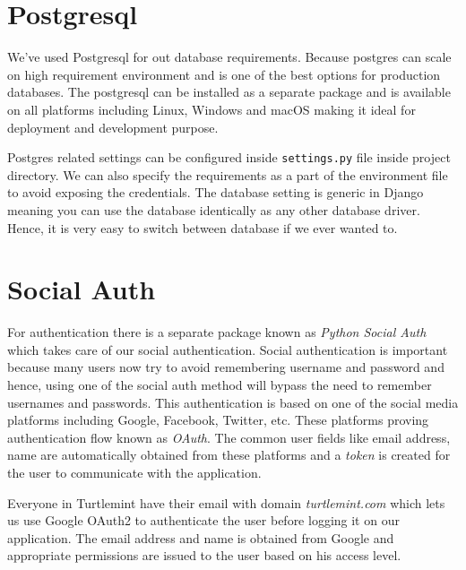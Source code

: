 \section{Postgresql}
We've used Postgresql for out database requirements. Because postgres can
scale on high requirement environment and is one of the best options for
production databases. The postgresql can be installed as a separate package
and is available on all platforms including Linux, Windows and macOS making
it ideal for deployment and development purpose.

Postgres related settings can be configured inside \texttt{settings.py} file
inside project directory. We can also specify the requirements as a part of the
environment file to avoid exposing the credentials. The database setting is
generic in Django meaning you can use the database identically as any other
database driver. Hence, it is very easy to switch between database if we ever
wanted to.

\section{Social Auth}
For authentication there is a separate package known as
\textit{Python Social Auth} which takes care of our social authentication.
Social authentication is important because many users now try to avoid
remembering username and password and hence, using one of the social auth
method will bypass the need to remember usernames and passwords. This
authentication is based on one of the social media platforms including Google,
Facebook, Twitter, etc. These platforms proving authentication flow known as
\textit{OAuth}. The common user fields like email address, name are
automatically obtained from these platforms and a \textit{token} is created
for the user to communicate with the application.

Everyone in Turtlemint have their email with domain \textit{turtlemint.com}
which lets us use Google OAuth2 to authenticate the user before logging it
on our application. The email address and name is obtained from Google and
appropriate permissions are issued to the user based on his access level.
